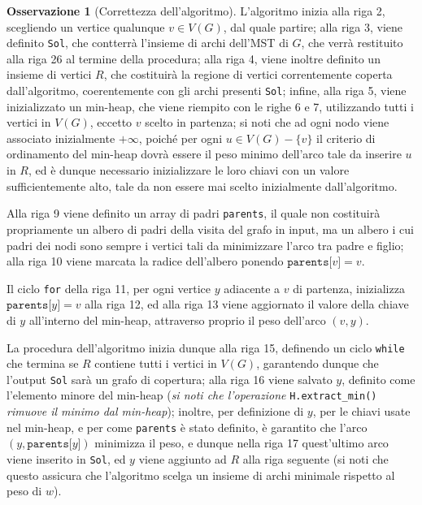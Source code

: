 \documentclass[14pt]{extreport}
\theoremstyle{definition}
\theoremstyle{definition}
\newtheorem{remark}{Osservazione}[subsection]
\begin{document}
\begin{remark}[Correttezza dell'algoritmo]
    L'algoritmo inizia alla riga 2, scegliendo un vertice qualunque $v \in V(G)$, dal quale partire; alla riga 3, viene definito \texttt{Sol}, che contterrà l'insieme di archi dell'MST di $G$, che verrà restituito alla riga 26 al termine della procedura; alla riga 4, viene inoltre definito un insieme di vertici $R$, che costituirà la regione di vertici correntemente coperta dall'algoritmo, coerentemente con gli archi presenti \texttt{Sol}; infine, alla riga 5, viene inizializzato un min-heap, che viene riempito con le righe 6 e 7, utilizzando tutti i vertici in $V(G)$, eccetto $v$ scelto in partenza; si noti che ad ogni nodo viene associato inizialmente $+ \infty$, poiché per ogni $u \in V(G) - \{v\}$ il criterio di ordinamento del min-heap dovrà essere il peso minimo dell'arco tale da inserire $u$ in $R$, ed è dunque necessario inizializzare le loro chiavi con un valore sufficientemente alto, tale da non essere mai scelto inizialmente dall'algoritmo.

    Alla riga 9 viene definito un array di padri \texttt{parents}, il quale non costituirà propriamente un albero di padri della visita del grafo in input, ma un albero i cui padri dei nodi sono sempre i vertici tali da minimizzare l'arco tra padre e figlio; alla riga 10 viene marcata la radice dell'albero ponendo $\texttt{parents[}v\texttt{]} = v$.

    Il ciclo \texttt{for} della riga 11, per ogni vertice $y$ adiacente a $v$ di partenza, inizializza $\texttt{parents[}y\texttt{]} = v$ alla riga 12, ed alla riga 13 viene aggiornato il valore della chiave di $y$ all'interno del min-heap, attraverso proprio il peso dell'arco $(v, y)$.

    La procedura dell'algoritmo inizia dunque alla riga 15, definendo un ciclo \texttt{while} che termina se $R$ contiene tutti i vertici in $V(G)$, garantendo dunque che l'output \texttt{Sol} sarà un grafo di copertura; alla riga 16 viene salvato $y$, definito come l'elemento minore del min-heap (\textit{si noti che l'operazione} \texttt{H.extract\_min()} \textit{rimuove il minimo dal min-heap}); inoltre, per definizione di $y$, per le chiavi usate nel min-heap, e per come \texttt{parents} è stato definito, è garantito che l'arco $(y, \texttt{parents[}y\texttt{]})$ minimizza il peso, e dunque nella riga 17 quest'ultimo arco viene inserito in \texttt{Sol}, ed $y$ viene aggiunto ad $R$ alla riga seguente (si noti che questo assicura che l'algoritmo scelga un insieme di archi minimale rispetto al peso di $w$).


\end{remark}
\end{document}
